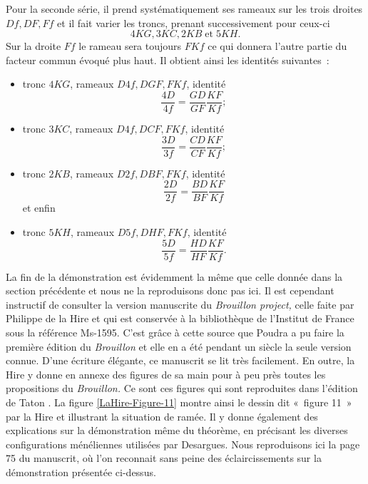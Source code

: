 \documentclass[12pt, a4paper]{article}
\begin{document}
Pour la seconde série, il prend systématiquement ses rameaux sur les trois droites $Df, DF, Ff$ et il fait varier les troncs, prenant successivement pour ceux-ci
\[
4KG, 3KC, 2KB\;\mbox{et}\;5KH.
\]
Sur la droite $Ff$ le rameau sera toujours $FKf$ ce qui donnera l'autre partie du facteur commun évoqué plus haut. Il obtient ainsi les identités suivantes~:~
\begin{itemize}
\item tronc $4KG$, rameaux $D4f, DGF, FKf$, identité
\[
\frac{4D}{4f}=\frac{GD}{GF}\frac{KF}{Kf};
\]
\item tronc $3KC$, rameaux $D4f, DCF, FKf$, identité
\[
\frac{3D}{3f}=\frac{CD}{CF}\frac{KF}{Kf};
\]
\item tronc $2KB$, rameaux $D2f, DBF, FKf$, identité
\[
\frac{2D}{2f}=\frac{BD}{BF}\frac{KF}{Kf}
\]
et enfin
\item tronc $5KH$, rameaux $D5f, DHF, FKf$, identité
\[
\frac{5D}{5f}=\frac{HD}{HF}\frac{KF}{Kf}.
\]
\end{itemize}
La fin de la démonstration est évidemment la même que celle donnée dans la section précédente et nous ne la reproduisons donc pas ici.  Il est cependant instructif de consulter la version manuscrite du \textit{Brouillon project,} celle faite par Philippe de la Hire et qui est conservée à la bibliothèque de l'Institut de France sous la référence Ms-1595. C'est grâce à cette source que Poudra a pu faire la première édition du \textit{Brouillon} et elle en a été pendant un siècle la seule version connue. D'une écriture élégante, ce manuscrit se lit très facilement. En outre, la Hire y donne en annexe des figures de sa main pour à peu près toutes les propositions du \textit{Brouillon.} Ce sont ces figures qui sont reproduites dans l'édition de Taton \cite{taton}. La figure \ref{LaHire-Figure-11} montre ainsi le dessin dit «~figure 11~» par la Hire et illustrant la situation de ramée. Il y donne également des explications sur la démonstration même du théorème, en précisant les diverses configurations ménéliennes utilisées par Desargues. Nous reproduisons ici la page 75 du manuscrit, où l'on reconnait sans peine des éclaircissements sur la démonstration présentée ci-dessus.
\end{document}
